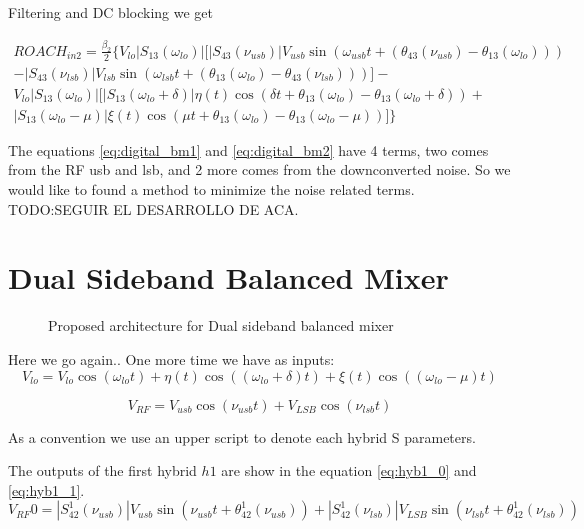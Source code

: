 Filtering and DC blocking we get 

\begin{equation}
\label{eq:digital_bm2}
    \boxed{
    \begin{gathered}
        ROACH_{in2} =\frac{ \beta_{2}}{2} \big\{V_{lo}|S_{13}(\omega_{lo})|[ |S_{43}(\nu_{usb})|V_{usb}\sin(\omega_{usb}t+(\theta_{43}(\nu_{usb})-\theta_{13}(\omega_{lo})))\\-|S_{43}(\nu_{lsb})|V_{lsb}\sin(\omega_{lsb}t+(\theta_{13}(\omega_{lo})-\theta_{43}(\nu_{lsb})))]-\\
        V_{lo}|S_{13}(\omega_{lo})|[|S_{13}(\omega_{lo}+\delta)|\eta(t)\cos(\delta t+\theta_{13}(\omega_{lo})-\theta_{13}(\omega_{lo}+\delta)) +\\ |S_{13}(\omega_{lo}-\mu)|\xi(t)\cos(\mu t+\theta_{13}(\omega_{lo})-\theta_{13}(\omega_{lo}-\mu))] \big\}
    \end{gathered}
    }
\end{equation}

\vspace{0.5cm}
The equations \ref{eq:digital_bm1} and \ref{eq:digital_bm2} have 4 terms, two comes from the RF usb and lsb, and 2 more comes from the downconverted noise. So we would like to found a method to minimize the noise related terms.
TODO:SEGUIR EL DESARROLLO DE ACA.



\section{Dual Sideband Balanced Mixer}


\begin{figure}[t]
    \centering
    
    \caption{Proposed architecture for Dual sideband balanced mixer }
    \label{fig:bm_roach}
\end{figure}

Here we go again.. One more time we have as inputs:
\begin{equation}
    V_{lo} = V_{lo}\cos(\omega_{lo}t)+\eta(t)\cos((\omega_{lo}+\delta)t)+\xi(t)\cos((\omega_{lo}-\mu)t)
\end{equation}

\begin{equation}
    V_{RF} = V_{usb}\cos(\nu_{usb}t)+V_{LSB}\cos(\nu_{lsb}t)
\end{equation}


As a convention we use an upper script to denote each hybrid S parameters.


The outputs of the first hybrid $h1$ are show in the equation \ref{eq:hyb1_0} and \ref{eq:hyb1_1}.
\begin{equation}
    \label{eq:hyb1_0}
    V_{RF}0 = |S_{42}^1(\nu_{usb})|V_{usb}\sin(\nu_{usb}t+\theta_{42}^1(\nu_{usb}))+|S_{42}^1(\nu_{lsb})|V_{LSB}\sin(\nu_{lsb}t+\theta_{42}^1(\nu_{lsb}))
\end{equation}


